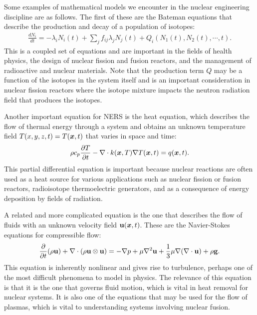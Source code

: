 Some examples of mathematical models we encounter in the nuclear engineering discipline are as follows. The first of these are the Bateman equations that describe the production and decay of a population of isotopes:
\begin{align}
  \frac{dN_i}{dt} = -\lambda_i N_i(t) + \sum_j f_{ij} \lambda_j N_j(t) + Q_i(N_1(t),N_2(t),\cdots,t).
\end{align}
This is a coupled set of equations and are important in the fields of health physics, the design of nuclear fission and fusion reactors, and the management of radioactive and nuclear materials. Note that the production term $Q$ may be a function of the isotopes in the system itself and is an important consideration in nuclear fission reactors where the isotope mixture impacts the neutron radiation field that produces the isotopes.

Another important equation for NERS is the heat equation, which describes the flow of thermal energy through a system and obtains an unknown temperature field $T(x,y,z,t) = T(\bm{x},t)$ that varies in space and time:
\begin{align}
  \rho c_p \frac{ \partial T }{ \partial t } - \nabla \cdot k(\bm{x},T) \nabla T(\bm{x},t) = q(\bm{x},t).
\end{align}
This partial differential equation is important because nuclear reactions are often used as a heat source for various applications such as nuclear fission or fusion reactors, radioisotope thermoelectric generators, and as a consequence of energy deposition by fields of radiation.

A related and more complicated equation is the one that describes the flow of fluids with an unknown velocity field $\mathbf{u}(\bm{x},t)$. These are the Navier-Stokes equations for compressible flow:
\begin{align}
  \frac{ \partial {} }{ \partial {t} }(\rho \mathbf{u}) + \nabla \cdot ( \rho \mathbf{u} \otimes \mathbf{u} ) = -\nabla p + \mu \nabla^2 \mathbf{u} + \frac{1}{3} \mu \nabla ( \nabla \cdot \mathbf{u} ) + \rho \mathbf{g}.
\end{align}
This equation is inherently nonlinear and gives rise to turbulence, perhaps one of the most difficult phenomena to model in physics. The relevance of this equation is that it is the one that governs fluid motion, which is vital in heat removal for nuclear systems. It is also one of the equations that may be used for the flow of plasmas, which is vital to understanding systems involving nuclear fusion.

